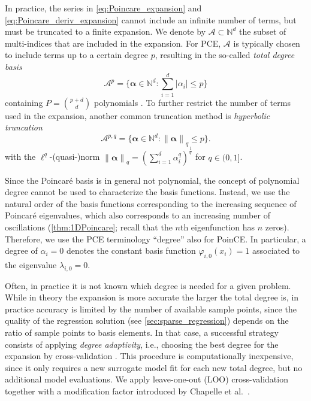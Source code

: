 \documentclass[a4paper,11pt]{article}
\newcommand{\curlyA}{{\mathcal A}}
\newcommand{\Nn}{\mathbb{N}}
\newcommand{\ve}[1]{\boldsymbol{#1}}
\newcommand{\norme}[2]{\left\| #1 \right\|_{#2}}
\newcommand{\alp}{{\ve{\alpha}}}
\renewcommand{\citep}[2][]{\cite[#1]{#2}}
\renewcommand{\citet}[2][]{\cite[#1]{#2}}
\theoremstyle{definition}
\theoremstyle{remark}
\theoremstyle{theorem}
\begin{document}
In practice, the series in \eqref{eq:Poincare_expansion} and \eqref{eq:Poincare_deriv_expansion} cannot include an infinite number of terms, but must be truncated to a finite expansion. We denote by $\curlyA \subset \Nn^d$ the subset of multi-indices that are included in the expansion. For PCE, $\curlyA$ is typically chosen to include terms up to a certain degree $p$, resulting in the so-called \textit{total degree basis}
\begin{equation}
\curlyA^p = \{\alp \in \Nn^d: \sum_{i=1}^d |\alpha_i| \leq p\}
\end{equation}
containing $P = \binom{p+d}{d}$ polynomials \citep{SudretREEF2006,sud08}.
To further restrict the number of terms used in the expansion, another common truncation method is \textit{hyperbolic truncation} \citep{blasud11} 
\begin{equation}
\curlyA^{p,q} = \{\alp \in \Nn^d: \norme{\alp}{q} \leq p\}.
\end{equation}
with the $\ell^q$-(quasi-)norm $\norme{\alp}{q} = \left( \sum_{i=1}^d \alpha_i^q \right)^\frac{1}{q}$ for $q\in (0,1]$.

Since the Poincar\'e basis is in general not polynomial, the concept of polynomial degree cannot be used to characterize the basis functions. Instead, we use the natural order of the basis functions corresponding to the increasing sequence of Poincar\'e eigenvalues, which also corresponds to an increasing number of oscillations (\cref{thm:1DPoincare}; recall that the $n$th eigenfunction has $n$ zeros). 
Therefore, we use the PCE terminology ``degree'' also for PoinCE. In particular, a degree of $\alpha_i = 0$ denotes the constant basis function $\varphi_{i, 0}(x_i) = 1$ associated to the eigenvalue $\lambda_{i, 0} = 0$.

Often, in practice it is not known which degree is needed for a given problem.
While in theory the expansion is more accurate the larger the total degree is, in practice accuracy is limited by the number of available sample points, since the quality of the regression solution (see \cref{sec:sparse_regression}) depends on the ratio of sample points to basis elements.
In that case, a successful strategy consists of applying \textit{degree adaptivity}, i.e., choosing the best degree for the expansion by cross-validation \citep{blasud11, LuethenIJUQ2022}.
This procedure is computationally inexpensive, since it only requires a new surrogate model fit for each new total degree, but no additional model evaluations.
We apply leave-one-out (LOO) cross-validation together with a modification factor introduced by Chapelle et al.~\citet{Chapelle2002, blasud11}.
\end{document}
